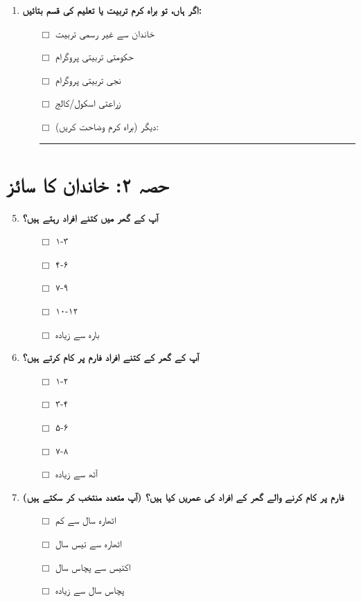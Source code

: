 \documentclass[12pt]{article}
\begin{document}
\begin{urdu}
\begin{enumerate}[label=\arabic*.]
    \item \textbf{اگر ہاں، تو براہ کرم تربیت یا تعلیم کی قسم بتائیں:}
    \begin{itemize}
        \item [$\Box$] خاندان سے غیر رسمی تربیت
        \item [$\Box$] حکومتی تربیتی پروگرام
        \item [$\Box$] نجی تربیتی پروگرام
        \item [$\Box$] زراعتی اسکول/کالج
        \item [$\Box$] دیگر (براہ کرم وضاحت کریں): \rule{10cm}{0.4pt}
    \end{itemize}
\end{enumerate}

\section*{حصہ ۲: خاندان کا سائز}

\begin{enumerate}[label=\arabic*.]
    \setcounter{enumi}{4}
    \item \textbf{آپ کے گھر میں کتنے افراد رہتے ہیں؟}
    \begin{itemize}
        \item [$\Box$] ۱-۳
        \item [$\Box$] ۴-۶
        \item [$\Box$] ۷-۹
        \item [$\Box$] ۱۰-۱۲
        \item [$\Box$] بارہ سے زیادہ
    \end{itemize}
    \item \textbf{آپ کے گھر کے کتنے افراد فارم پر کام کرتے ہیں؟}
    \begin{itemize}
        \item [$\Box$] ۱-۲
        \item [$\Box$] ۳-۴
        \item [$\Box$] ۵-۶
        \item [$\Box$] ۷-۸
        \item [$\Box$] آٹھ سے زیادہ
    \end{itemize}
    \item \textbf{فارم پر کام کرنے والے گھر کے افراد کی عمریں کیا ہیں؟ (آپ متعدد منتخب کر سکتے ہیں)}
    \begin{itemize}
        \item [$\Box$] اٹھارہ سال سے کم
        \item [$\Box$] اٹھارہ سے تیس سال
        \item [$\Box$] اکتیس سے پچاس سال
        \item [$\Box$] پچاس سال سے زیادہ
    \end{itemize}
\end{enumerate}


\end{urdu}
\end{document}
